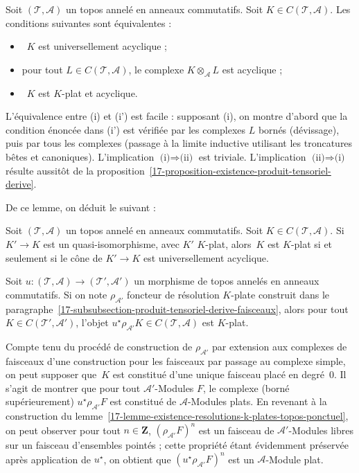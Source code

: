 \documentclass[10pt]{../fichiers-configuration-latex/smfart}
\begin{document}
\begin{lemme3}
Soit $(\mathscr T,\mathscr A)$ un topos annelé en anneaux commutatifs.
Soit $K\in C(\mathscr T,\mathscr A)$. Les conditions suivantes sont
équivalentes :
\begin{itemize}
\item[(i)] $K$ est universellement acyclique ;
\item[(i')] pour tout $L\in C(\mathscr T,\mathscr A)$, le complexe
$K\otimes_{\mathscr A} L$ est acyclique ;
\item[(ii)] $K$ est $K$-plat et acyclique.
\end{itemize}
\end{lemme3}

L'équivalence entre (i) et (i') est facile : supposant (i), on montre
d'abord que la condition énoncée dans (i') est vérifiée par les complexes
$L$ bornés (dévissage), puis par tous les complexes (passage à la limite
inductive utilisant les troncatures bêtes et canoniques). L'implication
$\text{(i)}\Longrightarrow\text{(ii)}$ est triviale. L'implication
$\text{(ii)}\Longrightarrow\text{(i)}$ résulte aussitôt de la
proposition~\ref{17-proposition-existence-produit-tensoriel-derive}.

\medskip

De ce lemme, on déduit le suivant :

\begin{lemme3}
Soit $(\mathscr T,\mathscr A)$ un topos annelé en anneaux commutatifs.
Soit $K\in C(\mathscr T,\mathscr A)$. Si $K'\to K$ est un
quasi-isomorphisme, avec $K'$ $K$-plat, alors $K$ est $K$-plat si et
seulement si le cône de $K'\to K$ est universellement acyclique.
\end{lemme3}

\begin{lemme3}
Soit $u\colon (\mathscr T,\mathscr A)\to (\mathscr T',\mathscr A')$ un
morphisme de topos annelés en anneaux commutatifs.
Si on note $\rho_{\mathscr A'}$ 
foncteur de résolution $K$-plate construit dans le 
paragraphe~\ref{17-subsubsection-produit-tensoriel-derive-faisceaux}, alors
pour tout $K\in C(\mathscr T',\mathscr A')$, l'objet $u^\star\rho_{\mathscr
A'}K\in C(\mathscr T,\mathscr A)$ est $K$-plat.
\end{lemme3}

Compte tenu du procédé de construction de $\rho_{\mathscr A'}$ par
extension aux complexes de faisceaux d'une construction pour les faisceaux
par passage au complexe simple, on peut supposer que $K$ est constitué
d'une unique faisceau placé en degré $0$. Il s'agit de montrer que pour
tout $\mathscr A'$-Modules $F$, le complexe (borné supérieurement)
$u^\star \rho_{\mathscr A'}F$ est constitué de $\mathscr A$-Modules plats.
En revenant à la construction du
lemme~\ref{17-lemme-existence-resolutions-k-plates-topos-ponctuel}, on peut
observer pour tout $n\in\mathbf{Z}$, $(\rho_{\mathscr A'}F)^n$ est un
faisceau de $\mathscr A'$-Modules libres sur un faisceau d'ensembles
pointés ; cette propriété étant évidemment préservée après application de
$u^\star$, on obtient que $(u^\star \rho_{\mathscr A'}F)^n$ est un
$\mathscr A$-Module plat.
\end{document}
